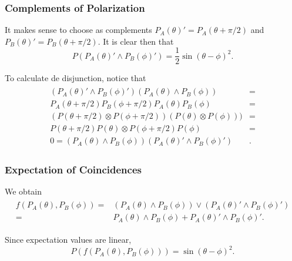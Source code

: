 \documentclass{beamer}
\begin{document}
\begin{frame}

	\frametitle{Complements of Polarization}
	
	It makes sense to choose as complements $P_A(\theta)'=P_A(\theta+\pi/2)$ and $P_B(\theta)'=P_B(\theta+\pi/2)$. It is clear then that 
	\begin{equation}
		P(P_A(\theta)'\wedge P_B(\phi)')=\frac{1}{2}\sin(\theta-\phi)^2.
	\end{equation}
	
\end{frame}

\begin{frame}

	To calculate de disjunction, notice that
	\begin{align}
	\begin{split}
		(P_A(\theta)'\wedge P_B(\phi)')(P_A(\theta)\wedge P_B(\phi))&=\\
		P_A(\theta+\pi/2)P_B(\phi+\pi/2)P_A(\theta)P_B(\phi)&=\\
		(P(\theta+\pi/2)\otimes P(\phi+\pi/2))(P(\theta)\otimes P(\phi)))&=\\
		P(\theta+\pi/2)P(\theta)\otimes P(\phi+\pi/2)P(\phi)&=\\
		0=(P_A(\theta)\wedge P_B(\phi))(P_A(\theta)'\wedge P_B(\phi)')&.
	\end{split}
	\end{align}	 

\end{frame}

\begin{frame}

	\frametitle{Expectation of Coincidences}
	
	We obtain
	\begin{align}
	\begin{split}
	f(P_A(\theta),P_B(\phi))=&(P_A(\theta)\wedge P_B(\phi))\vee(P_A(\theta)'\wedge P_B(\phi)')\\
	=&P_A(\theta)\wedge P_B(\phi)+P_A(\theta)'\wedge P_B(\phi)'.
	\end{split}
	\end{align}
	
	Since expectation values are linear, 
	\begin{equation}
	P(f(P_A(\theta),P_B(\phi)))=\sin(\theta-\phi)^2.
	\end{equation}
	
\end{frame}
\end{document}

